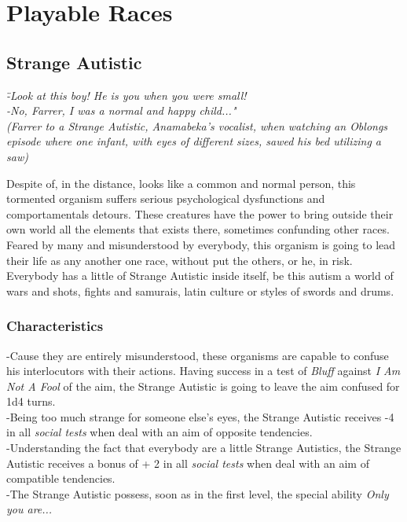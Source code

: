 \documentclass[ letterpaper,12pt]{article}
\begin{document}
\section{Playable Races}

\subsection{Strange Autistic}
{\it \" -Look at this boy! He is you when you were small!\\
 -No, Farrer, I was a normal and happy child..."\\
(Farrer to a Strange Autistic, Anamabeka's vocalist, when watching an Oblongs episode where one infant, with eyes of different sizes, sawed his bed utilizing a saw)\\}

Despite of, in the distance, looks like a common and normal person, this
tormented organism suffers serious psychological dysfunctions and
comportamentals detours. These creatures have the power to bring outside their
own world all the elements that exists there, sometimes confunding other races.
Feared by many and misunderstood by everybody, this organism is going to lead
their life as any another one race, without put the others, or he, in risk.
Everybody has a little of Strange Autistic inside itself, be this autism a
world of wars and shots, fights and samurais, latin culture or styles of swords
and drums.

\subsubsection{Characteristics}
-Cause they are entirely misunderstood, these organisms are capable to confuse his interlocutors with their actions. Having success in a test of {\it Bluff} against {\it I Am Not A Fool} of the aim, the Strange Autistic is going to leave the aim confused for 1d4 turns.\\
-Being too much strange for someone else's eyes, the Strange Autistic receives -4 in all {\it social tests} when deal with an aim of opposite tendencies. \\
-Understanding the fact that everybody are a little Strange Autistics, the Strange Autistic receives a bonus of + 2 in all {\it social tests} when deal with an aim of compatible tendencies.\\
-The Strange Autistic possess, soon as in the first level, the special ability {\it Only you are...}\\
\end{document}
